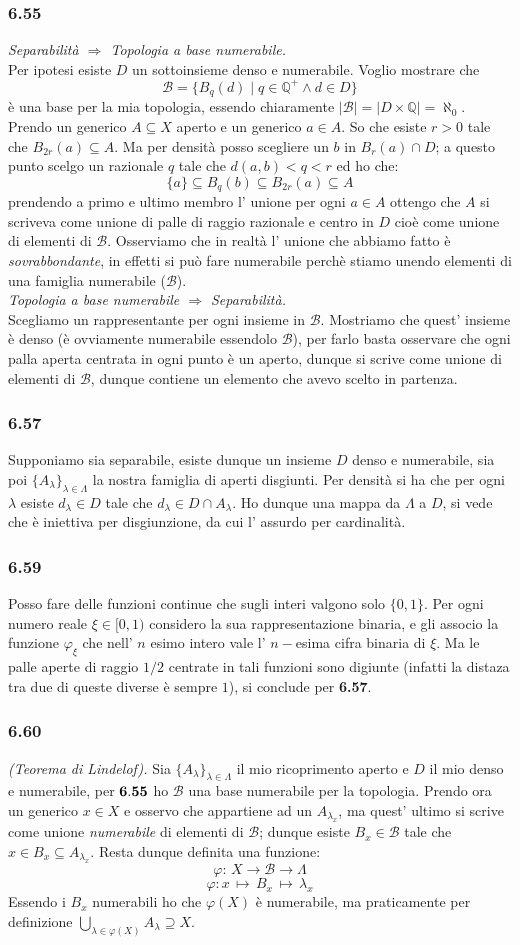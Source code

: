 \documentclass[a4paper,11pt]{article}
\newcommand{\ex}[1]{\subsubsection*{#1}}
\newcommand{\QQ}{\mathbb{Q}}
\newcommand{\cart}{\times}
\newcommand{\rec}[1]{{\bf #1}}
\newcommand{\norm}[1]{\mid{#1}\mid}
\begin{document}
\ex{6.55}{\it Separabilità $\Rightarrow$ Topologia a base numerabile.}\\
Per ipotesi esiste $D$ un sottoinsieme denso e numerabile. Voglio mostrare che
$$\mathcal{B}=\{B_q(d)\mid q\in\QQ^+ \wedge d\in D\}$$
è una base per la mia topologia, essendo chiaramente $\norm{\mathcal{B}}=\norm{D\cart \QQ}=\aleph_0$. Prendo un generico $A\subseteq X$ aperto e un generico $a\in A$. So che esiste $r>0$ tale che $B_{2r}(a)\subseteq A$. Ma per densità posso scegliere un $b$ in $B_r(a)\cap D$; a questo punto scelgo un razionale $q$ tale che $d(a,b)<q<r$ ed ho che:
$$
\{a\}\subseteq B_q(b)\subseteq B_{2r}(a)\subseteq A
$$
prendendo a primo e ultimo membro l' unione per ogni $a\in A$ ottengo che $A$ si scriveva come unione di palle di raggio razionale e centro in $D$ cioè come unione di elementi di $\mathcal{B}$. Osserviamo che in realtà l' unione che abbiamo fatto è {\it sovrabbondante}, in effetti si può fare numerabile perchè stiamo unendo elementi di una famiglia numerabile ($\mathcal{B}$).\\
{\it Topologia a base numerabile $\Rightarrow$ Separabilità.}\\
Scegliamo un rappresentante per ogni insieme in $\mathcal{B}$. Mostriamo che quest' insieme è denso (è ovviamente numerabile essendolo $\mathcal{B}$), per farlo basta osservare che ogni palla aperta centrata in ogni punto è un aperto, dunque si scrive come unione di elementi di $\mathcal{B}$, dunque contiene un elemento che avevo scelto in partenza.\\
\ex{6.57} Supponiamo sia separabile, esiste dunque un insieme $D$ denso e numerabile, sia poi $\{A_{\lambda}\}_{\lambda\in\Lambda}$ la nostra famiglia di aperti disgiunti. Per densità si ha che per ogni $\lambda$ esiste $d_{\lambda}\in D$ tale che $d_{\lambda}\in D \cap A_{\lambda}$. Ho dunque una mappa da $\Lambda$ a $D$, si vede che è iniettiva per disgiunzione, da cui l' assurdo per cardinalità.
\ex{6.59} Posso fare delle funzioni continue che sugli interi valgono solo $\{0, 1\}$. Per ogni numero reale $\xi \in[0,1)$ considero la sua rappresentazione binaria, e gli associo la funzione $\varphi _{\xi}$ che nell' $n$ esimo intero vale l' $n-$esima cifra binaria di $\xi$. Ma le palle aperte di raggio $1/2$ centrate in tali funzioni sono digiunte (infatti la distaza tra due di queste diverse è sempre $1$), si conclude per \rec{6.57}.
\ex{6.60} {\it (Teorema di Lindelof).} Sia $\{A_{\lambda}\}_{\lambda\in\Lambda}$ il mio ricoprimento aperto e $D$ il mio denso e numerabile, per $\rec{6.55}$ ho $\mathcal{B}$ una base numerabile per la topologia. Prendo ora un generico $x\in X$ e osservo che appartiene ad un $A_{\lambda_x}$, ma quest' ultimo si scrive come unione {\it numerabile} di elementi di ${\mathcal{B}}$; dunque esiste $B_x \in \mathcal{B}$ tale che $x\in B_x\subseteq A_{\lambda_x}$. Resta dunque definita una funzione:
$$
\varphi:\,  X \rightarrow \mathcal{B} \rightarrow \Lambda
$$
$$
\varphi: x\, \mapsto\, B_x\, \mapsto \, \lambda_x
$$
Essendo i $B_x$ numerabili ho che $\varphi(X)$ è numerabile, ma praticamente per definizione $\displaystyle \bigcup_{\lambda \in \varphi (X)}A_{\lambda}\supseteq X$.\\
\end{document}
